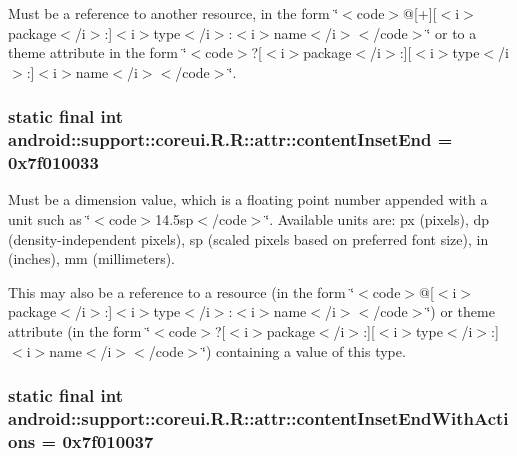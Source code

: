 Must be a reference to another resource, in the form \char`\"{}$<$code$>$@\mbox{[}+\mbox{]}\mbox{[}$<$i$>$package$<$/i$>$:\mbox{]}$<$i$>$type$<$/i$>$:$<$i$>$name$<$/i$>$$<$/code$>$\char`\"{} or to a theme attribute in the form \char`\"{}$<$code$>$?\mbox{[}$<$i$>$package$<$/i$>$:\mbox{]}\mbox{[}$<$i$>$type$<$/i$>$:\mbox{]}$<$i$>$name$<$/i$>$$<$/code$>$\char`\"{}. \hypertarget{classandroid_1_1support_1_1coreui_1_1_r_1_1attr_80477126df1802a386a62fd87e8867e6}{
\subsubsection[{contentInsetEnd}]{\setlength{\rightskip}{0pt plus 5cm}static final int android::support::coreui.R.R::attr::contentInsetEnd = 0x7f010033}}
\label{classandroid_1_1support_1_1coreui_1_1_r_1_1attr_80477126df1802a386a62fd87e8867e6}


Must be a dimension value, which is a floating point number appended with a unit such as \char`\"{}$<$code$>$14.5sp$<$/code$>$\char`\"{}. Available units are: px (pixels), dp (density-independent pixels), sp (scaled pixels based on preferred font size), in (inches), mm (millimeters). 

This may also be a reference to a resource (in the form \char`\"{}$<$code$>$@\mbox{[}$<$i$>$package$<$/i$>$:\mbox{]}$<$i$>$type$<$/i$>$:$<$i$>$name$<$/i$>$$<$/code$>$\char`\"{}) or theme attribute (in the form \char`\"{}$<$code$>$?\mbox{[}$<$i$>$package$<$/i$>$:\mbox{]}\mbox{[}$<$i$>$type$<$/i$>$:\mbox{]}$<$i$>$name$<$/i$>$$<$/code$>$\char`\"{}) containing a value of this type. \hypertarget{classandroid_1_1support_1_1coreui_1_1_r_1_1attr_9e837c986ae7bd86a252eecd42639e9b}{
\subsubsection[{contentInsetEndWithActions}]{\setlength{\rightskip}{0pt plus 5cm}static final int android::support::coreui.R.R::attr::contentInsetEndWithActions = 0x7f010037}}
\label{classandroid_1_1support_1_1coreui_1_1_r_1_1attr_9e837c986ae7bd86a252eecd42639e9b}


